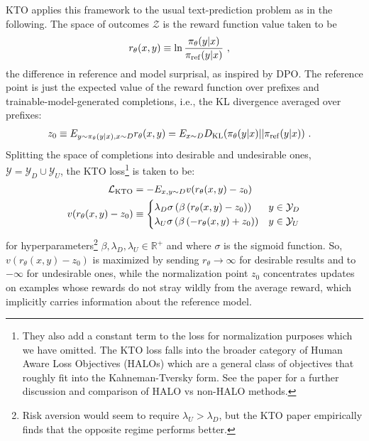 \documentclass[11pt]{article}
\begin{document}
KTO applies this framework to the usual text-prediction problem as in the following. The space of
outcomes $ \mathcal{Z} $ is the reward function value taken to be
\begin{align}
    r _{ \theta  }(x, y)&\equiv \ln \frac{ \pi _{ \theta  }(y|x) }{ \pi _{ {\rm ref}}(y|x) } \ , \label{eq_kto_reward}
\end{align}
the difference in reference and model surprisal, as inspired by DPO. The reference point is just the
expected value of the reward function over prefixes and trainable-model-generated completions, i.e.,
the KL divergence averaged over prefixes:
\begin{align}
   z _{ 0 }  & \equiv  E _{ y \sim \pi _{ \theta  }(y|x)  ,   x \sim D  }r _{ \theta  }(x, y) =E _{ x \sim D  } D _{ {\rm KL} }(\pi _{ \theta  }(y|x)|| \pi _{ {\rm ref} }(y|x)) \ . \label{eq_kto_ref_pt}
\end{align}
Splitting the space of completions into desirable and undesirable ones,  $ \mathcal{Y}=
\mathcal{Y}_{ D }\cup \mathcal{Y}_{ U } $, the KTO loss\footnote{They also add a constant term to
    the loss for normalization purposes which we have omitted. The KTO loss falls into the broader
    category of Human Aware Loss Objectives (HALOs) which are a general class of objectives that
    roughly fit into the Kahneman-Tversky form. See the paper for a further discussion and
    comparison of HALO vs non-HALO methods.
} is taken to be:
\begin{align}
    \mathcal{L}_{ {\rm KTO} } &= - E _{ x, y \sim D }v(r _{ \theta  }(x, y) - z _{ 0 })\nonumber\\
    v(r _{ \theta  }(x, y)-z _{ 0 })&\equiv  \begin{cases}
        \lambda _{ D }\sigma \left ( \beta \left ( r _{ \theta  }(x, y) - z _{ 0 } \right ) \right ) & y \in \mathcal{Y}_{ D }\nonumber\\
        \lambda _{ U }\sigma \left ( \beta \left ( -r _{ \theta  }(x, y) + z _{ 0 } \right ) \right ) & y \in \mathcal{Y}_{ U } \label{eq_kto_loss}
    \end{cases}
\end{align}
for hyperparameters\footnote{Risk aversion would seem to require $ \lambda _{ U }> \lambda _{ D }$,
but the KTO paper empirically finds that the opposite regime performs better.} $ \beta , \lambda _{ D }, \lambda _{ U } \in
\mathbb{R} ^{ + } $ and where $ \sigma  $ is the sigmoid function. So,  $ v(r _{ \theta  }(x,
y)-z _{ 0 }) $ is maximized by sending $ r _{ \theta   } \longrightarrow  \infty $ for desirable
results and to $ -\infty $ for undesirable ones, while the normalization point $ z _{ 0 } $
concentrates updates on examples whose rewards do not stray wildly from the average reward, which
implicitly carries information about the reference model.
\end{document}
